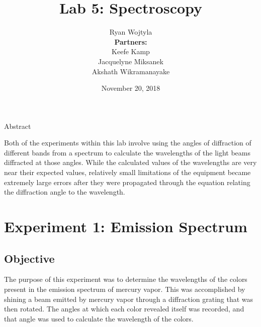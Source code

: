 \documentclass{article}
\begin{document}

\begin{titlepage}

  \title{Lab 5: Spectroscopy}
  \author{Ryan Wojtyla \\
    \textbf{Partners:} \\
    Keefe Kamp \\
    Jacquelyne Miksanek \\
    Akshath Wikramanayake \\
    }
  \date{November 20, 2018}

  \maketitle

  \begin{center}
    Abstract
  \end{center}

  \qq Both of the experiments within this lab involve using the angles of
  diffraction of different bands from a spectrum to calculate the wavelengths of
  the light beams diffracted at those angles. While the calculated values of the
  wavelengths are very near their expected values, relatively small limitations
  of the equipment became extremely large errors after they were propagated
  through the equation relating the diffraction angle to the wavelength.

  \thispagestyle{empty}

\end{titlepage}


\section{Experiment 1: Emission Spectrum}


\subsection{Objective}

\qq The purpose of this experiment was to determine the wavelengths of the
colors present in the emission spectrum of mercury vapor. This was accomplished
by shining a beam emitted by mercury vapor through a diffraction grating that
was then rotated. The angles at which each color revealed itself was recorded,
and that angle was used to calculate the wavelength of the colors.
\end{document}
